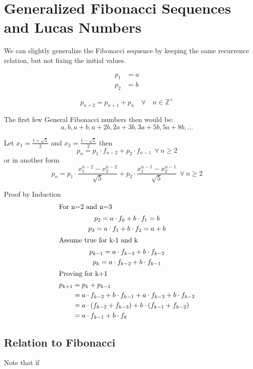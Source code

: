 \documentclass[a4paper]{article}
\begin{document}
\section{Generalized Fibonacci Sequences and Lucas Numbers}\label{fib:sec:general-fibonacci}
We can slightly generalize the Fibonacci sequence by keeping the same recurrence relation, but not fixing the initial values.

\begin{align}
p_1 &= a \\
p_2 &= b
\end{align}

\begin{equation}
p_{n+2} = p_{n+1} + p_{n} \quad \forall \quad n \in \mathbb{Z}^+\label{fib:eq:equation4}
\end{equation}

The first few General Fibonacci numbers then would be:
\[
a,b,a+b,a+2b,2a+3b,3a+5b,5a+8b, \ldots
\]

\begin{theorem}
Let
$x_1 = \frac{1 + \sqrt{5}}{2}$ and
$x_2 = \frac{1 - \sqrt{5}}{2}$ then
\[
p_n = p_1 \cdot f_{n-2} + p_2 \cdot f_{n-1}  \ \ \forall \  n \geq 2
\]
or in another form
\[
p_n = p_1 \cdot \frac{x_1^{n-2} - x_2^{n-2}}{\sqrt{5}} + p_2 \cdot \frac{x_1^{n-1} - x_2^{n-1}}{\sqrt{5}}  \ \ \forall \  n \geq 2
\]

Proof by Induction
\begin{gather*}
\shortintertext{For n=2 and n=3}
p_2 = a \cdot f_0 + b \cdot f_1 = b \\
p_3 = a \cdot f_1 + b \cdot f_2 = a + b \\
\shortintertext{Assume true for k-1 and k}
p_{k-1} = a \cdot f_{k-3} + b \cdot f_{k-2}\\
p_k = a \cdot f_{k-2} + b \cdot f_{k-1}\\
\shortintertext{Proving for k+1}
\begin{split}
p_{k+1} &= p_k + p_{k-1}\\
		&= a \cdot f_{k-2} + b \cdot f_{k-1} + a \cdot f_{k-3} + b \cdot f_{k-2}\\
		&= a \cdot (f_{k-2}+f_{k-3}) + b \cdot (f_{k-1}+f_{k-2})\\
		&= a \cdot f_{k-1} + b \cdot f_{k}\\
\end{split}
\end{gather*}
\end{theorem}

\subsection{Relation to Fibonacci}\label{fib:subsec:relation-to-fibonacci}
Note that if
\end{document}

